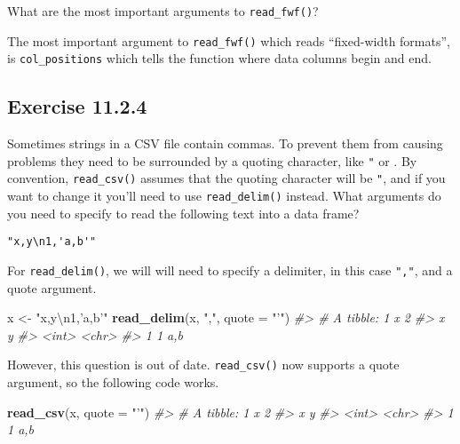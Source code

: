 \documentclass[]{book}
\newenvironment{Shaded}{\begin{snugshade}}{\end{snugshade}}
\newcommand{\CharTok}[1]{\textcolor[rgb]{0.31,0.60,0.02}{#1}}
\newcommand{\CommentTok}[1]{\textcolor[rgb]{0.56,0.35,0.01}{\textit{#1}}}
\newcommand{\DataTypeTok}[1]{\textcolor[rgb]{0.13,0.29,0.53}{#1}}
\newcommand{\KeywordTok}[1]{\textcolor[rgb]{0.13,0.29,0.53}{\textbf{#1}}}
\newcommand{\NormalTok}[1]{#1}
\newcommand{\StringTok}[1]{\textcolor[rgb]{0.31,0.60,0.02}{#1}}
\theoremstyle{plain}
\theoremstyle{remark}
\begin{document}
What are the most important arguments to \texttt{read\_fwf()}?

The most important argument to \texttt{read\_fwf()} which reads
``fixed-width formats'', is \texttt{col\_positions} which tells the
function where data columns begin and end.

\hypertarget{exercise-11.2.4}{%
\subsection*{\texorpdfstring{Exercise
{11.2.4}}{Exercise 11.2.4}}\label{exercise-11.2.4}}

Sometimes strings in a CSV file contain commas. To prevent them from
causing problems they need to be surrounded by a quoting character, like
\texttt{"} or \texttt{\textquotesingle{}}. By convention,
\texttt{read\_csv()} assumes that the quoting character will be
\texttt{"}, and if you want to change it you'll need to use
\texttt{read\_delim()} instead. What arguments do you need to specify to
read the following text into a data frame?

\begin{verbatim}
"x,y\n1,'a,b'"
\end{verbatim}

For \texttt{read\_delim()}, we will will need to specify a delimiter, in
this case \texttt{","}, and a quote argument.

\begin{Shaded}
\begin{Highlighting}[]
\NormalTok{x <-}\StringTok{ "x,y}\CharTok{\textbackslash{}n}\StringTok{1,'a,b'"}
\KeywordTok{read_delim}\NormalTok{(x, }\StringTok{","}\NormalTok{, }\DataTypeTok{quote =} \StringTok{"'"}\NormalTok{)}
\CommentTok{#> # A tibble: 1 x 2}
\CommentTok{#>       x y    }
\CommentTok{#>   <int> <chr>}
\CommentTok{#> 1     1 a,b}
\end{Highlighting}
\end{Shaded}

However, this question is out of date. \texttt{read\_csv()} now supports
a quote argument, so the following code works.

\begin{Shaded}
\begin{Highlighting}[]
\KeywordTok{read_csv}\NormalTok{(x, }\DataTypeTok{quote =} \StringTok{"'"}\NormalTok{)}
\CommentTok{#> # A tibble: 1 x 2}
\CommentTok{#>       x y    }
\CommentTok{#>   <int> <chr>}
\CommentTok{#> 1     1 a,b}
\end{Highlighting}
\end{Shaded}
\end{document}
